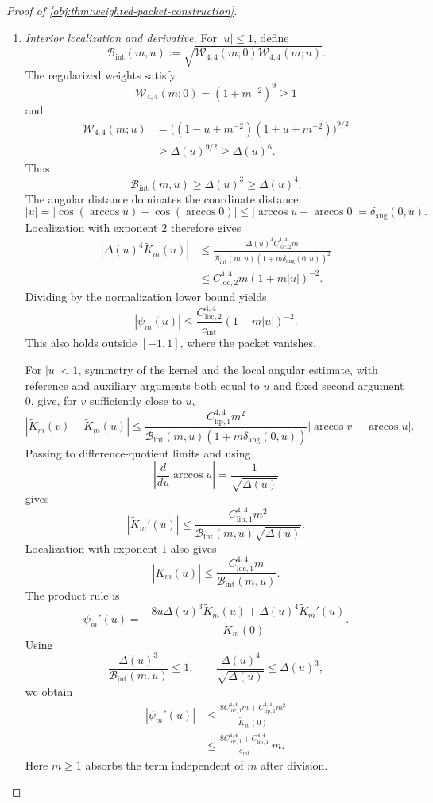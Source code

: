 \begin{proof}[Proof of \cref{obj:thm:weighted-packet-construction}]
\begin{enumerate}
\item \emph{Interior localization and derivative.}
For \(|u|\le1\), define
\[
\mathcal B_{\mathrm{int}}(m,u)
:=
\sqrt{\mathcal W_{4,4}(m;0)\mathcal W_{4,4}(m;u)}.
\]
The regularized weights satisfy
\[
\mathcal W_{4,4}(m;0)=(1+m^{-2})^9\ge1
\]
and
\[
\begin{split}
\mathcal W_{4,4}(m;u)
&=\bigl((1-u+m^{-2})(1+u+m^{-2})\bigr)^{9/2}\\
&\ge\Delta(u)^{9/2}\ge\Delta(u)^6.
\end{split}
\]
Thus
\[
\mathcal B_{\mathrm{int}}(m,u)\ge\Delta(u)^3\ge\Delta(u)^4.
\]
The angular distance dominates the coordinate distance:
\[
|u|
=
|\cos(\arccos u)-\cos(\arccos0)|
\le|\arccos u-\arccos0|
=
\delta_{\mathrm{ang}}(0,u).
\]
Localization with exponent \(2\) therefore gives
\[
\begin{split}
|\Delta(u)^4\widetilde K_m(u)|
&\le
\frac{\Delta(u)^4C_{\mathrm{loc},2}^{4,4}m}
{\mathcal B_{\mathrm{int}}(m,u)
 (1+m\delta_{\mathrm{ang}}(0,u))^2}\\
&\le C_{\mathrm{loc},2}^{4,4}m(1+m|u|)^{-2}.
\end{split}
\]
Dividing by the normalization lower bound yields
\[
|\psi_m(u)|
\le
\frac{C_{\mathrm{loc},2}^{4,4}}{c_{\mathrm{int}}}
(1+m|u|)^{-2}.
\]
This also holds outside \([-1,1]\), where the packet vanishes.

For \(|u|<1\), symmetry of the kernel and the local angular estimate, with reference and auxiliary arguments both equal to \(u\) and fixed second argument \(0\), give, for \(v\) sufficiently close to \(u\),
\[
|\widetilde K_m(v)-\widetilde K_m(u)|
\le
\frac{C_{\mathrm{lip},1}^{4,4}m^2}
{\mathcal B_{\mathrm{int}}(m,u)
 (1+m\delta_{\mathrm{ang}}(0,u))}
|\arccos v-\arccos u|.
\]
Passing to difference-quotient limits and using
\[
\left|\frac{d}{du}\arccos u\right|
=\frac1{\sqrt{\Delta(u)}}
\]
gives
\[
|\widetilde K_m'(u)|
\le
\frac{C_{\mathrm{lip},1}^{4,4}m^2}
{\mathcal B_{\mathrm{int}}(m,u)\sqrt{\Delta(u)}}.
\]
Localization with exponent \(1\) also gives
\[
|\widetilde K_m(u)|
\le
\frac{C_{\mathrm{loc},1}^{4,4}m}
{\mathcal B_{\mathrm{int}}(m,u)}.
\]
The product rule is
\[
\psi_m'(u)
=
\frac{-8u\Delta(u)^3\widetilde K_m(u)
+\Delta(u)^4\widetilde K_m'(u)}
{\widetilde K_m(0)}.
\]
Using
\[
\frac{\Delta(u)^3}{\mathcal B_{\mathrm{int}}(m,u)}\le1,
\qquad
\frac{\Delta(u)^4}{\sqrt{\Delta(u)}}\le\Delta(u)^3,
\]
we obtain
\[
\begin{split}
|\psi_m'(u)|
&\le
\frac{8C_{\mathrm{loc},1}^{4,4}m
      +C_{\mathrm{lip},1}^{4,4}m^2}
     {\widetilde K_m(0)}\\
&\le
\frac{8C_{\mathrm{loc},1}^{4,4}
      +C_{\mathrm{lip},1}^{4,4}}{c_{\mathrm{int}}}\,m.
\end{split}
\]
Here \(m\ge1\) absorbs the term independent of \(m\) after division.


\end{enumerate}
\end{proof}
